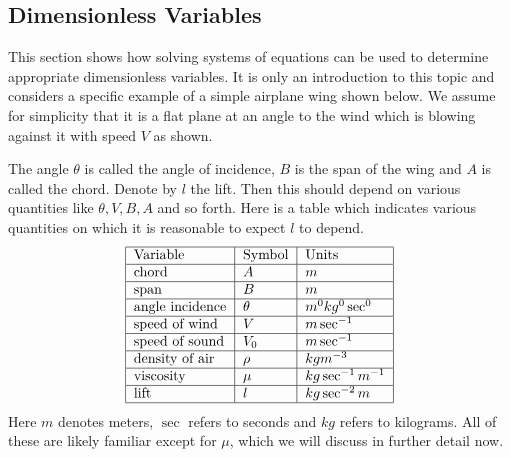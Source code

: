 \subsection{Dimensionless Variables}

This section shows how solving systems of equations can be used to
determine appropriate dimensionless variables. It is only an
introduction to this topic and considers a specific example of a
simple airplane wing shown below. We assume for simplicity that it is a flat plane at an angle to the wind which is blowing against it
with speed $V$ as shown.

\begin{center}
\end{center}

The angle $\theta$ is called the angle of incidence, $B$ is the span of the wing and $A$ is called the chord. Denote by $l$ the lift. Then this should depend on
various quantities like $\theta ,V,B,A$ and so forth. Here is a table which
indicates various quantities on which it is reasonable to expect $l$ to
depend. 
\begin{equation*}
\begin{tabular}{|l|l|l|}
\hline
Variable & Symbol & Units \\ \hline
chord & $A$ & $m$ \\ \hline
span & $B$ & $m$ \\ \hline
angle incidence & $\theta $ & $m^{0}kg^{0}\sec ^{0}$ \\ \hline
speed of wind & $V$ & $m\sec ^{-1}$ \\ \hline
speed of sound & $V_{0}$ & $m\sec ^{-1}$ \\ \hline
density of air & $\rho $ & $kgm^{-3}$ \\ \hline
viscosity & $\mu $ & $kg\sec ^{-1}m^{-1}$ \\ \hline
lift & $l$ & $kg\sec ^{-2}m$ \\ \hline
\end{tabular}
\end{equation*}
Here $m$ denotes meters, $\sec $ refers to seconds and $kg$ refers to
kilograms. All of these are likely familiar except for $\mu $, which we will discuss in further detail now. 

